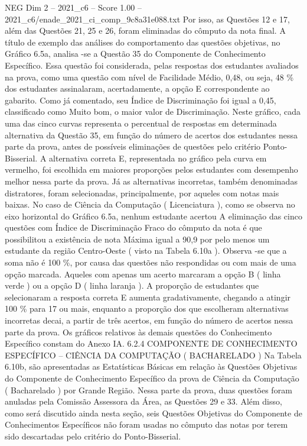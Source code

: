 \begin{textsample}{NEG Dim 2 – 2021\_c6 – Score 1.00 – 2021\_c6/enade\_2021\_ci\_comp\_9c8a31e088.txt}
Por isso, as Questões 12 e 17, além das Questões 21, 25 e 26, foram eliminadas do cômputo da nota final.
A título de exemplo das análises do comportamento das questões objetivas, no Gráfico 6.5a, analisa -se a Questão 35 do Componente de Conhecimento Específico.
Essa questão foi considerada, pelas respostas dos estudantes avaliados na prova, como uma questão com nível de Facilidade Médio, 0,48, ou seja, 48 \% dos estudantes assinalaram, acertadamente, a opção E correspondente ao gabarito.
Como já comentado, seu Índice de Discriminação foi igual a 0,45, classificado como Muito bom, o maior valor de Discriminação.
Neste gráfico, cada uma das cinco curvas representa o percentual de respostas em determinada alternativa da Questão 35, em função do número de acertos dos estudantes nessa parte da prova, antes de possíveis eliminações de questões pelo critério Ponto-Bisserial.
A alternativa correta E, representada no gráfico pela curva em vermelho, foi escolhida em maiores proporções pelos estudantes com desempenho melhor nessa parte da prova.
Já as alternativas incorretas, também denominadas distratores, foram selecionadas, principalmente, por aqueles com notas mais baixas.
No caso de Ciência da Computação ( Licenciatura ), como se observa no eixo horizontal do Gráfico 6.5a, nenhum estudante acertou A eliminação das cinco questões com Índice de Discriminação Fraco do cômputo da nota é que possibilitou a existência de nota Máxima igual a 90,9 por pelo menos um estudante da região Centro-Oeste ( visto na Tabela 6.10a ).
Observa -se que a soma não é 100 \%, por causa das questões não respondidas ou com mais de uma opção marcada.
Aqueles com apenas um acerto marcaram a opção B ( linha verde ) ou a opção D ( linha laranja ).
A proporção de estudantes que selecionaram a resposta correta E aumenta gradativamente, chegando a atingir 100 \% para 17 ou mais, enquanto a proporção dos que escolheram alternativas incorretas decai, a partir de três acertos, em função do número de acertos nessa parte da prova.
Os gráficos relativos às demais questões do Conhecimento Específico constam do Anexo IA. 6.2.4 COMPONENTE DE CONHECIMENTO ESPECÍFICO – CIÊNCIA DA COMPUTAÇÃO ( BACHARELADO ) Na Tabela 6.10b, são apresentadas as Estatísticas Básicas em relação às Questões Objetivas do Componente de Conhecimento Específico da prova de Ciência da Computação ( Bacharelado ) por Grande Região.
Nessa parte da prova, duas questões foram anuladas pela Comissão Assessora da Área, as Questões 29 e 33.
Além disso, como será discutido ainda nesta seção, seis Questões Objetivas do Componente de Conhecimentos Específicos não foram usadas no cômputo das notas por terem sido descartadas pelo critério do Ponto-Bisserial.

\end{textsample}

